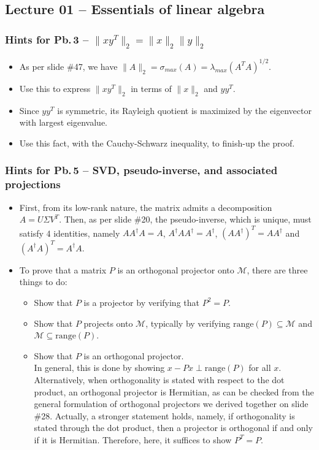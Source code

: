 \documentclass[letterpaper,10pt]{article}
\begin{document}
\subsection*{Lecture 01 -- Essentials of linear algebra}
\subsubsection*{Hints for Pb.$\,$3 -- $\|xy^T\|_2=\|x\|_2\|y\|_2$}
\begin{itemize}
\item[-] As per slide \#47, we have $\|A\|_2=\sigma_{max}(A)=\lambda_{max}(A^TA)^{1/2}$.
\item[-] Use this to express $\|xy^T\|_2$ in terms of $\|x\|_2$ and $yy^T$.
\item[-] Since $yy^T$ is symmetric, its Rayleigh quotient is maximized by the eigenvector with largest eigenvalue.
\item[-] Use this fact, with the Cauchy-Schwarz inequality, to finish-up the proof.
\end{itemize}

\subsubsection*{Hints for Pb.$\,$5 -- SVD, pseudo-inverse, and associated projections}
\begin{itemize}
\item[-] First, from its low-rank nature, the matrix admits a decomposition $A=U\Sigma V^T$.
Then, as per slide \#20, the pseudo-inverse, which is unique, must satisfy 4 identities, namely $AA^\dagger A=A$, $A^\dagger AA^\dagger=A^\dagger$, $(AA^\dagger)^T=AA^\dagger$ and $(A^\dagger A)^T=A^\dagger A$.
\item[-] To prove that a matrix $P$ is an orthogonal projector onto $\mathcal{M}$, there are three things to do:
\begin{itemize}
\item[1.] Show that $P$ is a projector by verifying that $P^2=P$.
\item[2.] Show that $P$ projects onto $\mathcal{M}$, typically by verifying $\mathrm{range}(P)\subseteq \mathcal{M}$ and $\mathcal{M}\subseteq \mathrm{range}(P)$.
\item[3.] Show that $P$ is an orthogonal projector.\vspace{.1cm}\\
In general, this is done by showing $x-Px\perp\mathrm{range}(P)$ for all $x$.\vspace{.1cm}\\
Alternatively, when orthogonality is stated with respect to the dot product, an orthogonal projector is Hermitian, as can be checked from the general formulation of orthogonal projectors we derived together on slide \#28.
Actually, a stronger statement holds, namely, if orthogonality is stated through the dot product, then a projector is orthogonal if and only if it is Hermitian.
Therefore, here, it suffices to show $P^T=P$.
\end{itemize}
\end{itemize}
\end{document}
